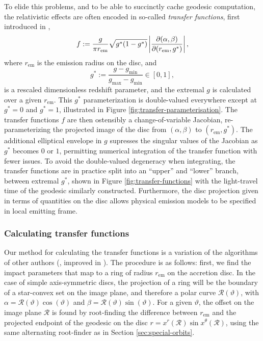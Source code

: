 To elide this problems, and to be able to succinctly cache geodesic computation, the relativistic effects are often encoded in so-called \emph{transfer functions}, first introduced in \cite{cunningham_effects_1975},
\begin{equation}
    f:=\frac{g}{\pi r_\text{em}} \sqrt{g^\ast(1 - g^\ast)} \left\lvert \frac{\partial (\alpha, \beta)}{\partial (r_\text{em}, g^\ast)} \right\rvert,
\end{equation}
where $r_\text{em}$ is the emission radius on the disc, and
\begin{equation}
    g^\ast := \frac{g - g_\text{min}}{g_\text{max} - g_\text{min}} \in [0, 1],
\end{equation}
is a rescaled dimensionless redshift parameter, and the extremal $g$ is calculated over a given $r_\text{em}$. This $g^\ast$ parameterization is double-valued everywhere except at $g^\ast = 0$ and $g^\ast = 1$, illustrated in Figure \ref{fig:transfer-parameterisation}. The transfer functions $f$ are then ostensibly a change-of-variable Jacobian, re-parameterizing the projected image of the disc from $(\alpha, \beta)$ to $(r_\text{em}, g^\ast)$. The additional elliptical envelope in $g$ supresses the singular values of the Jacobian as $g^\ast$ becomes $0$ or $1$, permitting numerical integration of the transfer function with fewer issues. To avoid the double-valued degeneracy when integrating, the transfer functions are in practice split into an ``upper'' and ``lower'' branch, between extremal $g^\ast$, shown in Figure \ref{fig:transfer-functions} with the light-travel time of the geodesic similarly constructed. Furthermore, the disc projection given in terms of quantities on the disc allows physical emission models to be specified in local emitting frame.

\subsubsection{Calculating transfer functions}

Our method for calculating the transfer functions is a variation of the algorithms of other authors (\citealp{speith_photon_1995,bambi_testing_2017}, improved in \citealp{abdikamalov_public_2019}). The procedure is as follows: first, we find the impact parameters that map to a ring of radius $r_\text{em}$ on the accretion disc. In the case of simple axis-symmetric discs, the projection of a ring will be the boundary of a star-convex set on the image plane, and therefore a polar curve $\mathcal{R}(\vartheta)$, with $\alpha = \mathcal{R}(\vartheta) \cos(\vartheta)$ and $\beta = \mathcal{R}(\vartheta) \sin(\vartheta)$. For a given $\vartheta$, the offset on the image plane $\mathcal{R}$ is found by root-finding the difference between $r_\text{em}$ and the projected endpoint of the geodesic on the disc $r = x^r (\mathcal{R}) \sin x^\theta(\mathcal{R})$, using the same alternating root-finder as in Section \ref{sec:special-orbits}.

